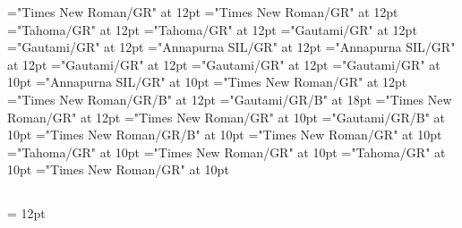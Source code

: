 \documentclass[a4paper,twoside]{article}
\begin{document}
\pagestyle{plain}
\sloppy
\setlength{\parfillskip}{0pt plus 1fil}
\font\diven="Times New Roman/GR" at 12pt
\font\spanen="Times New Roman/GR" at 12pt
\font\divggofonipaxemic="Tahoma/GR" at 12pt
\font\spanggofonipaxemic="Tahoma/GR" at 12pt
\font\divte="Gautami/GR" at 12pt
\font\spante="Gautami/GR" at 12pt
\font\divhi="Annapurna SIL/GR" at 12pt
\font\spanhi="Annapurna SIL/GR" at 12pt
\font\divggoTeluIN="Gautami/GR" at 12pt
\font\spanggoTeluIN="Gautami/GR" at 12pt
\font\xitemte="Gautami/GR" at 10pt
\font\xitemhi="Annapurna SIL/GR" at 10pt
\font\xitemtpi="Times New Roman/GR" at 12pt
\font{}="Times New Roman/GR/B" at 12pt
\font{}="Gautami/GR/B" at 18pt
\font{}="Times New Roman/GR" at 12pt
\font\entryletDatadicBody="Times New Roman/GR" at 10pt
\font\headwordggoTeluINentryletDatadicBody="Gautami/GR/B" at 10pt
\font\spanenheadwordggoTeluINentryletDatadicBody="Times New Roman/GR/B" at 10pt
\font\pronunciationsentryletDatadicBody="Times New Roman/GR" at 10pt
\font\pronunciationggofonipaxemicpronunciationsentryletDatadicBody="Tahoma/GR" at 10pt
\font\spanenpronunciationggofonipaxemicpronunciationsentryletDatadicBody="Times New Roman/GR" at 10pt
\font\spanggofonipaxemicpronunciationggofonipaxemicpronunciationsentryletDatadicBody="Tahoma/GR" at 10pt
\font\spanenpronunciationsentryletDatadicBody="Times New Roman/GR" at 10pt

\mbox{} 
\newpage 
\newpage 
\setcounter{page}{1} 
\pagestyle{fancy} 
\begin{center}\begin{center}

\section*{}\end{center}
\end{center}\setlength{\columnsep}{12pt} 
\setlength\columnseprule{0.4pt} 
\begin{multicols}{2}{\raggedright} 
\hangindent= 12pt
 \spanenpronunciationggofonipaxemicpronunciationsentryletDatadicBody{[}\spanenpronunciationggofonipaxemicpronunciationsentryletDatadicBody{]} 
 \end{multicols}
\end{document}
